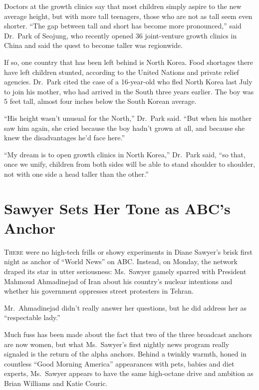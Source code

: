 ﻿\documentclass[12pt]{article}
\begin{document}
Doctors at the growth clinics say that most children simply aspire to the new average height, but
with more tall teenagers, those who are not as tall seem even shorter. ``The gap between tall and
short has become more pronounced,'' said Dr.~Park of Seojung, who recently opened 36 joint-venture
growth clinics in China and said the quest to become taller was regionwide.

If so, one country that has been left behind is North Korea. Food shortages there have left children
stunted, according to the United Nations and private relief agencies. Dr.~Park cited the case of a
16-year-old who fled North Korea last July to join his mother, who had arrived in the South three
years earlier. The boy was 5 feet tall, almost four inches below the South Korean average.

``His height wasn't unusual for the North,'' Dr.~Park said. ``But when his mother saw him again, she
cried because the boy hadn't grown at all, and because she knew the disadvantages he'd face here.''

``My dream is to open growth clinics in North Korea,'' Dr.~Park said, ``so that, once we unify,
children from both sides will be able to stand shoulder to shoulder, not with one side a head taller
than the other.''

\section{Sawyer Sets Her Tone as ABC's Anchor}

\lettrine{T}{here} were no high-tech frills or showy experiments in Diane
Sawyer's brisk first night as anchor of ``World News'' on ABC. Instead, on Monday, the network
draped its star in utter seriousness: Ms.~Sawyer gamely sparred with President Mahmoud Ahmadinejad
of Iran about his country's nuclear intentions and whether his government oppresses street
protesters in Tehran.

Mr.~Ahmadinejad didn't really answer her questions, but he did address her as ``respectable lady.''

Much fuss has been made about the fact that two of the three broadcast anchors are now women, but
what Ms.~Sawyer's first nightly news program really signaled is the return of the alpha anchors.
Behind a twinkly warmth, honed in countless ``Good Morning America'' appearances with pets, babies
and diet experts, Ms.~Sawyer appears to have the same high-octane drive and ambition as Brian
Williams and Katie Couric.
\end{document}
